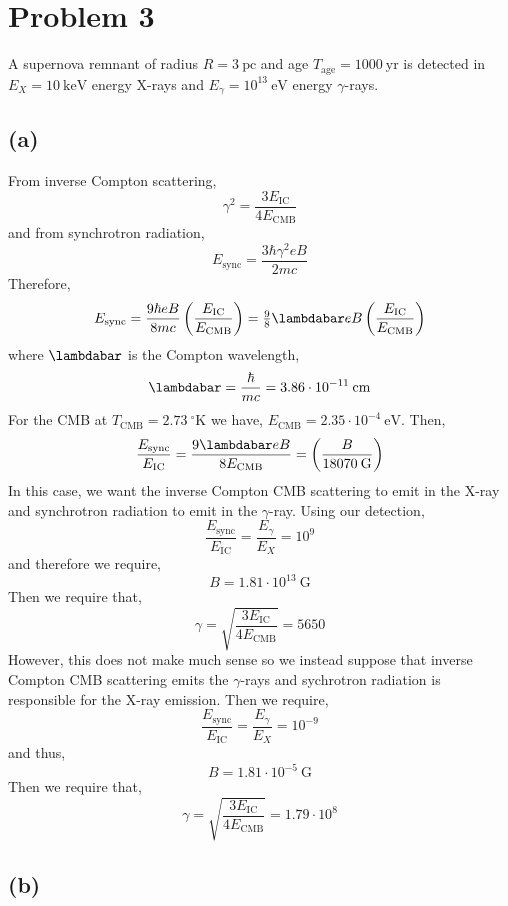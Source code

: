 \documentclass[12pt]{article}
\begin{document}
\section{Problem 3}

A supernova remnant of radius $R = 3 \: \mathrm{pc}$ and age $T_{\text{age}} = 1000 \: \mathrm{yr}$ is detected in $E_{X} = 10 \: \mathrm{keV}$ energy X-rays and $E_{\gamma} = 10^{13} \: \mathrm{eV}$ energy $\gamma$-rays.

\subsection*{(a)}


From inverse Compton scattering,
\[ \gamma^2 = \frac{3 E_{\mathrm{IC}}}{4 E_{\text{CMB}}} \]
and from synchrotron radiation,
\[ E_{\mathrm{sync}} = \frac{3 \hbar \gamma^2 e B}{2 m c} \]
Therefore,
\[ E_{\mathrm{sync}} = \frac{9 \hbar e B}{8 m c} \left( \frac{E_{\mathrm{IC}}}{E_{\mathrm{CMB}}} \right) = \tfrac{9}{8} \lambdabar e B \left( \frac{E_{\mathrm{IC}}}{E_{\mathrm{CMB}}} \right) \]
where $\lambdabar$ is the Compton wavelength,
\[ \lambdabar = \frac{\hbar}{mc} = 3.86 \cdot 10^{-11} \: \mathrm{cm} \]
For the CMB at $T_{\text{CMB}} = 2.73 \:^\circ \mathrm{K}$ we have, $E_{\text{CMB}} = 2.35 \cdot 10^{-4} \: \mathrm{eV}$. Then,
\[ \frac{E_{\text{sync}}}{E_{\text{IC}}} = \frac{9 \lambdabar e B}{8 E_{\text{CMB}}} = \left( \frac{B}{18070 \: \mathrm{G}} \right) \]
In this case, we want the inverse Compton CMB scattering to emit in the X-ray and synchrotron radiation to emit in the $\gamma$-ray. Using our detection,
\[ \frac{E_{\text{sync}}}{E_{\text{IC}}} = \frac{E_{\gamma}}{E_X} = 10^9 \]
and therefore we require,
\[ B = 1.81 \cdot 10^{13} \: \mathrm{G} \]
Then we require that,
\[ \gamma = \sqrt{\frac{3 E_{\mathrm{IC}}}{4 E_{\mathrm{CMB}}}} = 5650 \]
However, this does not make much sense so we instead suppose that inverse Compton CMB scattering emits the $\gamma$-rays and sychrotron radiation is responsible for the X-ray emission. Then we require,
\[ \frac{E_{\text{sync}}}{E_{\text{IC}}} = \frac{E_{\gamma}}{E_X} = 10^{-9} \]
and thus,
\[ B = 1.81 \cdot 10^{-5} \: \mathrm{G} \]
Then we require that,
\[ \gamma = \sqrt{\frac{3 E_{\mathrm{IC}}}{4 E_{\mathrm{CMB}}}} = 1.79 \cdot 10^{8} \]

\subsection*{(b)}
\end{document}
